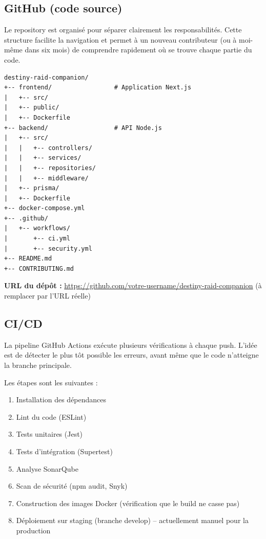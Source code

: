 \subsection{GitHub (code source)}

Le repository est organisé pour séparer clairement les responsabilités. Cette structure facilite la navigation et permet à un nouveau contributeur (ou à moi-même dans six mois) de comprendre rapidement où se trouve chaque partie du code.

\begin{verbatim}
destiny-raid-companion/
+-- frontend/                 # Application Next.js
|   +-- src/
|   +-- public/
|   +-- Dockerfile
+-- backend/                  # API Node.js
|   +-- src/
|   |   +-- controllers/
|   |   +-- services/
|   |   +-- repositories/
|   |   +-- middleware/
|   +-- prisma/
|   +-- Dockerfile
+-- docker-compose.yml
+-- .github/
|   +-- workflows/
|       +-- ci.yml
|       +-- security.yml
+-- README.md
+-- CONTRIBUTING.md
\end{verbatim}

\textbf{URL du dépôt :} \url{https://github.com/votre-username/destiny-raid-companion} (à remplacer par l'URL réelle)

\subsection{CI/CD}

La pipeline GitHub Actions exécute plusieurs vérifications à chaque push. L'idée est de détecter le plus tôt possible les erreurs, avant même que le code n'atteigne la branche principale.

Les étapes sont les suivantes :
\begin{enumerate}
    \item Installation des dépendances
    \item Lint du code (ESLint)
    \item Tests unitaires (Jest)
    \item Tests d'intégration (Supertest)
    \item Analyse SonarQube
    \item Scan de sécurité (npm audit, Snyk)
    \item Construction des images Docker (vérification que le build ne casse pas)
    \item Déploiement sur staging (branche develop) – actuellement manuel pour la production
\end{enumerate}

